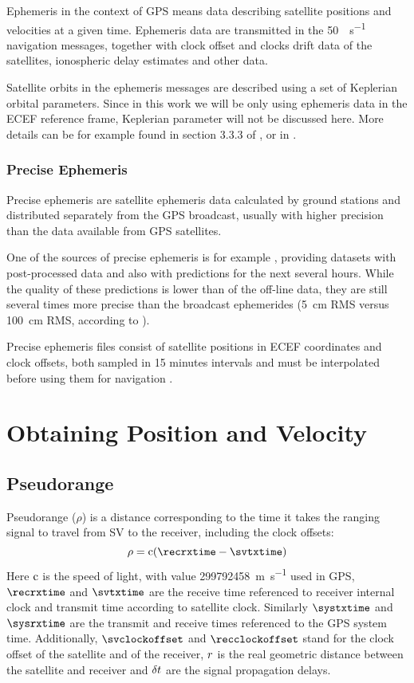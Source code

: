 Ephemeris in the context of GPS means data describing satellite positions and velocities
at a given time.
Ephemeris data are transmitted in the \SI{50}{\bit\per\second} navigation messages,
together with clock offset and clocks drift data of the satellites, ionospheric
delay estimates and other data.

Satellite orbits in the ephemeris messages are described using a set of Keplerian orbital parameters.
Since in this work we will be only using ephemeris data in the ECEF reference frame, Keplerian parameter
will not be discussed here.
More details can be for example found in section 3.3.3 of \cite{rizos99}, or in \cite{kaplan06}.

\subsubsection{Precise Ephemeris}
Precise ephemeris are satellite ephemeris data calculated by ground stations
and distributed separately from the GPS broadcast, usually with higher precision
than the data available from GPS satellites.

One of the sources of precise ephemeris is for example \cite{orbit-data}, providing datasets with
post-processed data and also with predictions for the next several hours.
While the quality of these predictions is lower than of the off-line data,
they are still several times more precise than the broadcast ephemerides
(\SI{5}{\centi\meter} RMS versus \SI{100}{\centi\meter} RMS, according to \cite{orbit-data}).

Precise ephemeris files consist of satellite positions in ECEF
coordinates and clock offsets, both sampled in 15 minutes intervals and must be interpolated
before using them for navigation \cite{schenewerk03}.

\section{Obtaining Position and Velocity}


\subsection{Pseudorange}
\label{sec:pseudorange}

Pseudorange (\(\rho\)) is a distance corresponding to the time it takes the ranging
signal to travel from SV to the receiver, including the clock offsets:
\begin{equation}
	\label{eq:pseudorange}
	\rho = \speedoflight (\recrxtime - \svtxtime)
\end{equation}
Here \(\mathrm{c}\) is the speed of light, with value \SI{299792458}{\meter\per\second} used in GPS,
\(\recrxtime\) and \(\svtxtime\) are the receive time referenced to receiver internal clock
and transmit time according to satellite clock.
Similarly \(\systxtime\) and \(\sysrxtime\) are the transmit and receive times referenced
to the GPS system time.
Additionally, \(\svclockoffset\) and \(\recclockoffset\) stand for the clock offset of the satellite
and of the receiver, \(r\) is the real geometric distance between the satellite and receiver
and \(\delta{t}\) are the signal propagation delays.

